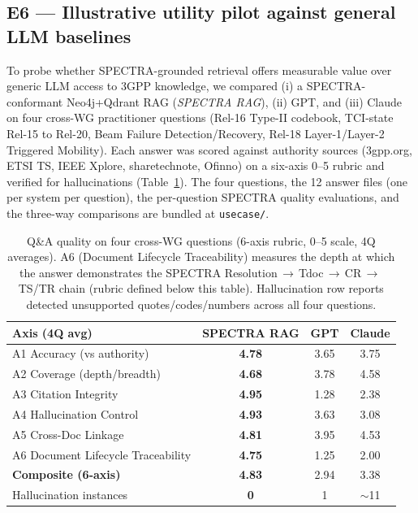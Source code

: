 \subsection{E6 --- Illustrative utility pilot against general LLM baselines}\label{sec:eval:llm}

To probe whether SPECTRA-grounded retrieval offers measurable value over generic LLM access to 3GPP knowledge, we compared (i) a SPECTRA-conformant Neo4j+Qdrant RAG (\emph{SPECTRA RAG}), (ii) GPT, and (iii) Claude on four cross-WG practitioner questions (Rel-16 Type-II codebook, TCI-state Rel-15 to Rel-20, Beam Failure Detection/Recovery, Rel-18 Layer-1/Layer-2 Triggered Mobility). Each answer was scored against authority sources (3gpp.org, ETSI TS, IEEE Xplore, sharetechnote, Ofinno) on a six-axis 0--5 rubric and verified for hallucinations (Table~\ref{tab:llm-eval}). The four questions, the 12 answer files (one per system per question), the per-question SPECTRA quality evaluations, and the three-way comparisons are bundled at \texttt{usecase/}.

\begin{table}[h]
\centering
\scriptsize
\setlength{\tabcolsep}{6pt}
\caption{Q\&A quality on four cross-WG questions (6-axis rubric, 0--5 scale, 4Q averages). A6 (Document Lifecycle Traceability) measures the depth at which the answer demonstrates the SPECTRA Resolution\,$\to$\,Tdoc\,$\to$\,CR\,$\to$\,TS/TR chain (rubric defined below this table). Hallucination row reports detected unsupported quotes/codes/numbers across all four questions.}
\label{tab:llm-eval}
\begin{tabular}{@{}lccc@{}}
\toprule
\textbf{Axis (4Q avg)} & \textbf{SPECTRA RAG} & \textbf{GPT} & \textbf{Claude} \\
\midrule
A1 Accuracy (vs authority)         & \textbf{4.78} & 3.65 & 3.75 \\
A2 Coverage (depth/breadth)        & \textbf{4.68} & 3.78 & 4.58 \\
A3 Citation Integrity              & \textbf{4.95} & 1.28 & 2.38 \\
A4 Hallucination Control           & \textbf{4.93} & 3.63 & 3.08 \\
A5 Cross-Doc Linkage               & \textbf{4.81} & 3.95 & 4.53 \\
A6 Document Lifecycle Traceability & \textbf{4.75} & 1.25 & 2.00 \\
\midrule
\textbf{Composite (6-axis)}        & \textbf{4.83} & 2.94 & 3.38 \\
\midrule
Hallucination instances    & \textbf{0}    & 1    & $\sim$11 \\
\bottomrule
\end{tabular}
\end{table}

